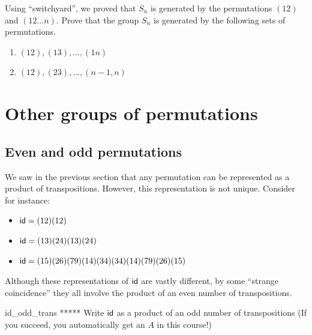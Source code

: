 \begin{exercise}{}
Using ``switchyard'', we proved that $S_n$ is generated by the permutations $(12)$ and $(12 \ldots n)$.
Prove that the group $S_n$ is generated by
the following sets of permutations.
\begin{enumerate}
 
 \item
$(1 2), (13), \ldots, (1n)$
 
 \item
$(1 2), (23), \ldots, (n- 1,n)$
 
 
\end{enumerate}
\end{exercise}

\section{Other groups of permutations }
\label{sec:Permutations:OtherGroups}

\subsection{Even and odd permutations}
\label{sec:Permutations:OtherGroups:EvenOddPermutaions}

We saw in the previous section that any permutation can be represented as a product of transpositions. However, this representation is not unique. Consider for instance:
\begin{itemize}
\item
${\sf{i}d}  = (1 2) ( 1 2)$
\item
${\sf{i}d}  = (1 3 )(2 4 )(1 3 )( 2 4 )$
\item
${\sf{i}d}  = (1 5 )(2 6 )(7 9 )( 1 4 )(3 4)(3 4)(1 4)(7 9)(2 6)(1 5)$
\end{itemize}

\noindent
Although these representations of ${\sf{i}d} $ are vastly different, by some ``strange coincidence'' they all involve the product of an even number of 
transpositions.  

%
%
%
%
\begin{exercise}{id_odd_trans}
***** Write ${\sf{i}d} $ as a product of an odd number of transpositions (If you succeed, you automatically get an $A$ in this course!)
\end{exercise}

